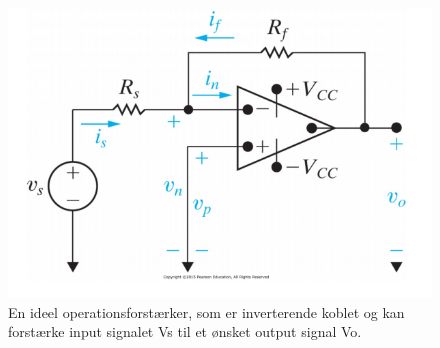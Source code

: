 \begin{figure}[H]
\centering
\includegraphics[scale=0.6]{figures/bProblemanalyse/inverterendeforstaerker.png}
\caption{En ideel operationsforstærker, som er inverterende koblet og kan forstærke input signalet Vs til et ønsket output signal Vo. \cite{Nilsson2011}}
\label{invf}
\end{figure}


